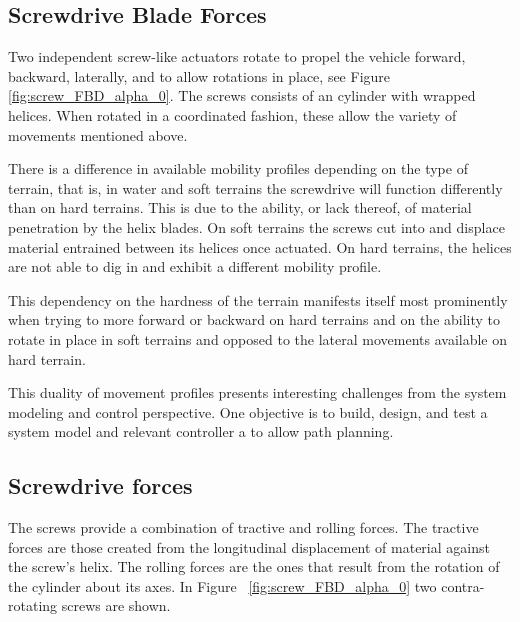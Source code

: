 \subsection{Screwdrive Blade Forces}

Two independent screw-like actuators rotate to propel the vehicle forward,
backward, laterally, and to allow rotations in place, see Figure~
\ref{fig:screw_FBD_alpha_0}. The screws consists of an cylinder with wrapped
helices. When rotated in a coordinated fashion, these allow the variety of
movements mentioned above.

There is a difference in available mobility profiles depending on the type of
terrain, that is, in water and soft terrains the screwdrive will function
differently than on hard terrains. This is due to the ability, or lack thereof,
of material penetration by the helix blades. On soft terrains the screws cut
into and displace material entrained between its helices once actuated. On hard
terrains, the helices are not able to dig in and exhibit a different mobility
profile.

This dependency on the hardness of the terrain manifests itself most prominently
when trying to more forward or backward on hard terrains and on the ability to
rotate in place in soft terrains and opposed to the lateral movements available
on hard terrain.

This duality of movement profiles presents interesting challenges from the
system modeling and control perspective. One objective is to build, design, and
test a system model and relevant controller a to allow path planning.



\subsection{Screwdrive forces}

The screws provide a combination of tractive and rolling forces. The tractive
forces are those created from the longitudinal displacement of material against
the screw's helix. The rolling forces are the ones that result from the rotation
of the cylinder about its axes. In Figure~ \ref{fig:screw_FBD_alpha_0} two
contra-rotating screws are shown.

